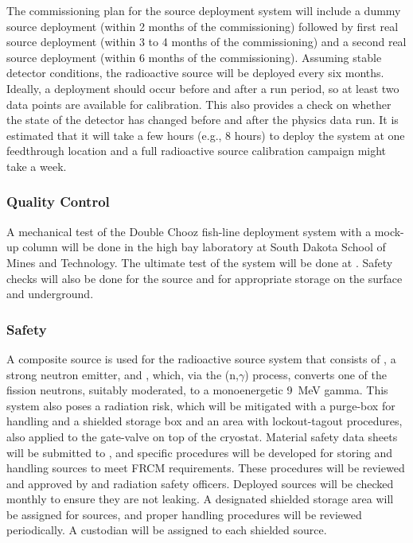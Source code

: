 The commissioning plan for the source deployment system will include a dummy source deployment (within 2 months of the commissioning) followed by first real source deployment (within 3 to 4 months of the commissioning) and a second real source deployment (within 6 months of the commissioning). Assuming stable detector conditions, the radioactive source will be deployed every six months. Ideally, a deployment should occur before and after a run period, so at least two data points are available for calibration. This also provides a check on whether the state of the detector
has changed before and after the physics data run.
It is estimated that it will take a few hours (e.g., 8 hours) to deploy the system at one feedthrough location and a full radioactive source calibration campaign might take %
a week.

\subsubsection{Quality Control}
A mechanical test of the Double Chooz fish-line deployment system with a  mock-up column will be done in the high bay laboratory at South Dakota School of Mines and Technology. The ultimate test of the system will be done at . Safety checks will also be done for the source and for appropriate storage on the surface and underground. 

\subsubsection{Safety}
\label{sec:sp-calib-rsds-safety}
A composite source is used for the radioactive source system that consists  of , a strong neutron emitter, and , which, via the (n,$\gamma$) process, converts one of the  fission neutrons, suitably moderated, to a monoenergetic \SI{9}{\MeV} gamma. This system also poses a radiation risk, which will be mitigated with a purge-box for handling and a shielded storage box and an area with lockout-tagout procedures, also applied to the gate-valve on top of the cryostat. Material safety data sheets will be submitted to  , and specific procedures will be developed for storing and handling sources to meet FRCM  requirements. These procedures will be reviewed and approved by  and  radiation safety officers. Deployed sources will be checked monthly to ensure they are not leaking. A designated shielded storage area will be assigned for sources, and proper handling procedures will be reviewed periodically. A custodian will be assigned to each shielded source.